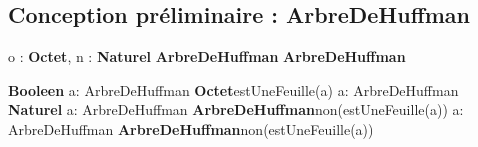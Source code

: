 \subsection{Conception préliminaire : ArbreDeHuffman}

\begin{algorithme}

    {o : \textbf{Octet}, n : \textbf{Naturel}}
    {\textbf{ArbreDeHuffman}}{}
     {\textbf{ArbreDeHuffman}}{}
    
    {\textbf{Booleen}}{}
    {a: ArbreDeHuffman}
    {\textbf{Octet}}{estUneFeuille(a)}
    {a: ArbreDeHuffman}
    {\textbf{Naturel}}{}
    {a: ArbreDeHuffman}
    {\textbf{ArbreDeHuffman}}{non(estUneFeuille(a))}
    {a: ArbreDeHuffman}
    {\textbf{ArbreDeHuffman}}{non(estUneFeuille(a))}
    
\end{algorithme}
